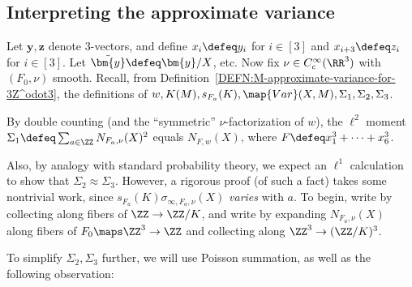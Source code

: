 \documentclass[12pt]{report}
\begin{document}
\subsection{Interpreting the approximate variance}

Let $\bm{y},\bm{z}$ denote $3$-vectors,
and define $x_i\defeq y_i$ for $i\in[3]$ and $x_{i+3}\defeq z_i$ for $i\in[3]$.
Let $\tilde{\bm{y}}\defeq \bm{y}/X$,
etc.
Now fix $\nu\in C^\infty_c(\RR^3)$ with $(F_0,\nu)$ smooth.
Recall,
from Definition~\ref{DEFN:M-approximate-variance-for-3Z^odot3},
the definitions of $w,K(M),s_{F_a}(K),
\map{Var}(X,M),\Sigma_1,\Sigma_2,\Sigma_3$.

By double counting (and the ``symmetric'' $\nu$-factorization of $w$),
the $\ell^2$ moment $\Sigma_1\defeq \sum_{a\in\ZZ}N_{F_a,\nu}(X)^2$ equals $N_{F,w}(X)$, where $F\defeq x_1^3+\dots+x_6^3$.

Also, by analogy with standard probability theory,
we expect an $\ell^1$ calculation to show that $\Sigma_2\approx\Sigma_3$.
However,
a rigorous proof
(of such a fact)
takes some nontrivial work,
since $s_{F_a}(K)\sigma_{\infty,F_a,\nu}(X)$ \emph{varies} with $a$.
To begin, write
by collecting along fibers of $\ZZ\to\ZZ/K$,
and write
by expanding $N_{F_a,\nu}(X)$ along fibers of $F_0\maps\ZZ^3\to\ZZ$
and collecting along $\ZZ^3\to(\ZZ/K)^3$.

To simplify $\Sigma_2,\Sigma_3$ further,
we will use Poisson summation,
as well as the following observation:
\end{document}
